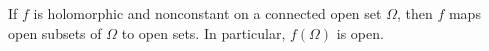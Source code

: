If $f$ is holomorphic and nonconstant on a connected open set $\Omega$, then $f$ maps open subsets of $\Omega$ to open sets. In particular, $f(\Omega)$ is open.
